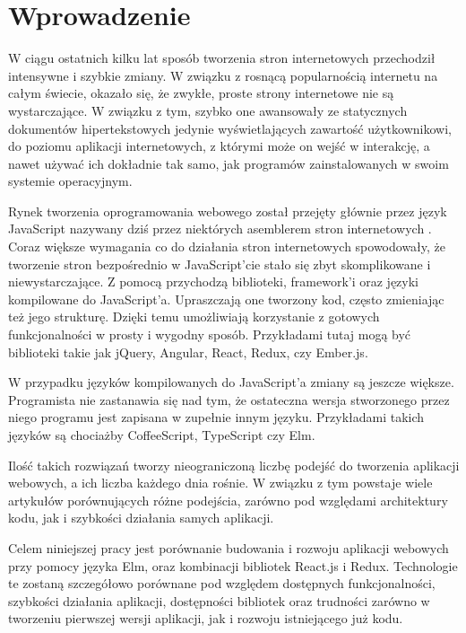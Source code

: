 \chapter{Wprowadzenie} \label{chap:wprowadzenie}

W ciągu ostatnich kilku lat sposób tworzenia stron internetowych przechodził intensywne i szybkie zmiany. W związku z rosnącą popularnością internetu na całym świecie, okazało się, że zwykłe, proste strony internetowe nie są wystarczające. W związku z tym, szybko one awansowały ze statycznych dokumentów hipertekstowych jedynie wyświetlających zawartość użytkownikowi, do poziomu aplikacji internetowych, z którymi może on wejść w interakcję, a nawet używać ich dokładnie tak samo, jak programów zainstalowanych w swoim systemie operacyjnym. 

Rynek tworzenia oprogramowania webowego został przejęty głównie przez język JavaScript nazywany dziś przez niektórych asemblerem stron internetowych \cite{JSAssembly}. Coraz większe wymagania co do działania stron internetowych spowodowały, że tworzenie stron bezpośrednio w JavaScript'cie stało się zbyt skomplikowane i niewystarczające. Z pomocą przychodzą biblioteki, framework'i oraz języki kompilowane do JavaScript'a. Upraszczają one tworzony kod, często zmieniając też jego strukturę. Dzięki temu umożliwiają korzystanie z gotowych funkcjonalności w prosty i wygodny sposób. Przykładami tutaj mogą być biblioteki takie jak jQuery, Angular, React, Redux, czy Ember.js. 

W przypadku języków kompilowanych do JavaScript'a zmiany są jeszcze większe. Programista nie zastanawia się nad tym, że ostateczna wersja stworzonego przez niego programu jest zapisana w zupełnie innym języku. Przykładami takich języków są chociażby CoffeeScript, TypeScript czy Elm.

Ilość takich rozwiązań tworzy nieograniczoną liczbę podejść do tworzenia aplikacji webowych, a ich liczba każdego dnia rośnie. W związku z tym powstaje wiele artykułów porównujących różne podejścia, zarówno pod względami architektury kodu, jak i szybkości działania samych aplikacji.

Celem niniejszej pracy jest porównanie budowania i rozwoju aplikacji webowych przy pomocy języka Elm, oraz kombinacji bibliotek React.js i Redux. Technologie te zostaną szczegółowo porównane pod względem dostępnych funkcjonalności, szybkości działania aplikacji, dostępności bibliotek oraz trudności zarówno w tworzeniu pierwszej wersji aplikacji, jak i rozwoju istniejącego już kodu.

